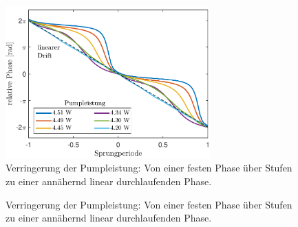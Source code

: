 \documentclass[bachelor,       %
               twoside,        %
               BCOR10mm,       %
               english,ngerman, %
               ]{GAUBM}
\begin{document}
\begin{figure}
	\centering
	\includegraphics[width=0.7\textwidth]{figures/steps_relativ2.pdf}
	\caption{Verringerung der Pumpleistung: Von einer festen Phase über Stufen zu einer annähernd linear durchlaufenden Phase.}
   \label{fig:165014steps2}
\end{figure}

\begin{figure}[!htb]
   \centering   
   \hfill
   \caption{Verringerung der Pumpleistung: Von einer festen Phase über Stufen zu einer annähernd linear durchlaufenden Phase.}
   \label{fig:160514steps2}
 \end{figure}
 
\end{document}

